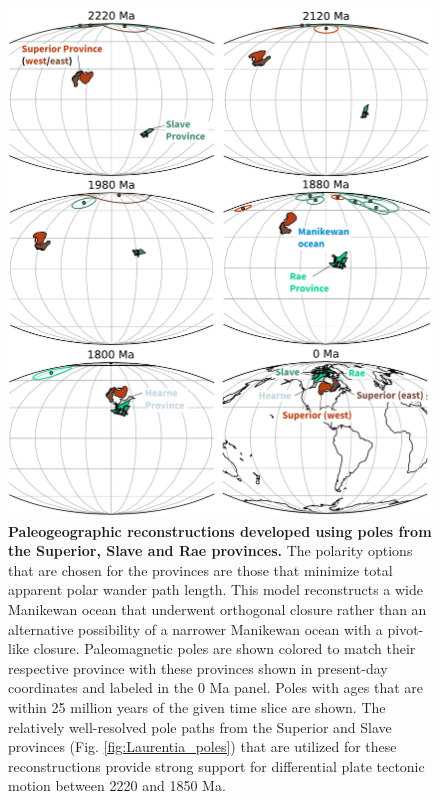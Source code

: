 \documentclass[twocolumn, switch]{article} %
\begin{document}
\begin{figure}
\centering
\includegraphics[width=6 in]{../Figures/Fig4_Superior_Slave_reconstructions.pdf}
\caption{\textbf{Paleogeographic reconstructions developed using poles from the Superior, Slave and Rae provinces.} The polarity options that are chosen for the provinces are those that minimize total apparent polar wander path length. This model reconstructs a wide Manikewan ocean that underwent orthogonal closure rather than an alternative possibility of a narrower Manikewan ocean with a pivot-like closure. Paleomagnetic poles are shown colored to match their respective province with these provinces shown in present-day coordinates and labeled in the 0 Ma panel. Poles with ages that are within 25 million years of the given time slice are shown. The relatively well-resolved pole paths from the Superior and Slave provinces (Fig. \ref{fig:Laurentia_poles}) that are utilized for these reconstructions provide strong support for differential plate tectonic motion between 2220 and 1850 Ma.}
\label{fig:Superior_Slave_recons}
\end{figure}
\end{document}
